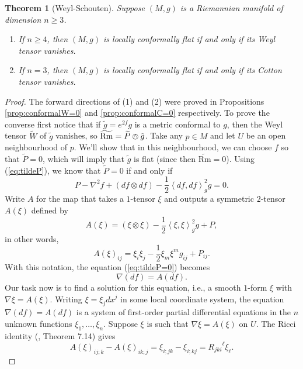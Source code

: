 \documentclass{amsart}
\numberwithin{equation}{section}
\newcommand{\law}{\left\langle}
\newcommand{\raw}{\right\rangle}
\newcommand{\Rm}{\mathrm{Rm}}
\theoremstyle{plain}
\newtheorem{thm}{Theorem}[section]
\theoremstyle{definition}
\theoremstyle{remark}
\begin{document}
\begin{thm}[Weyl-Schouten]
    Suppose $(M,g)$ is a Riemannian manifold of dimension $n \ge 3$.
    \begin{enumerate}
        \item If $n \ge 4$, then $(M, g)$ is locally conformally flat if and only if its Weyl tensor vanishes.
        \item If $n = 3$, then $(M,g)$ is locally conformally flat if and only if its Cotton tensor vanishes.
    \end{enumerate}
\end{thm}
\begin{proof}
    The forward directions of (1) and (2) were proved in Propositions \ref{prop:conformalW=0} and \ref{prop:conformalC=0} respectively. To prove the converse first notice that if $\tilde{g} = e^{2f}g$ is a metric conformal to $g$, then the Weyl tensor $\widetilde{W}$ of $\tilde{g}$ vanishes, so $\widetilde{\Rm} = \widetilde{P} \owedge \tilde{g}$. Take any $p \in M$ and let $U$ be an open neighbourhood of $p$. We'll show that in this neighbourhood, we can choose $f$ so that $\widetilde{P} = 0$, which will imply that $\tilde{g}$ is flat (since then $\widetilde{\Rm} = 0$). Using (\ref{eq:tildeP}), we know that $\widetilde{P} = 0$ if and only if
    \begin{equation}\label{eq:tildeP=0}
        P - \nabla^2 f + (df \otimes df) - \frac{1}{2}\law df, df \raw_g^2 g = 0.
    \end{equation}
    Write $A$ for the map that takes a $1$-tensor $\xi$ and outputs a symmetric $2$-tensor $A(\xi)$ defined by
    \[A(\xi) = (\xi \otimes \xi) - \frac{1}{2}\law \xi, \xi \raw_g^2 g + P, \]
    in other words,
    \begin{equation}\label{eq:A(xi)ij}
        A(\xi)_{ij} = \xi_i \xi_j - \frac{1}{2} \xi_m \xi^m g_{ij} + P_{ij}.
    \end{equation}
    With this notation, the equation (\ref{eq:tildeP=0}) becomes
    \[\nabla(df) = A(df).\]
    Our task now is to find a solution for this equation, i.e., a smooth $1$-form $\xi$ with $\nabla \xi = A(\xi)$. Writing $\xi = \xi_j dx^j$ in some local coordinate system, the equation $\nabla(df) = A(df)$ is a system of first-order partial differential equations in the $n$ unknown functions $\xi_1, \ldots, \xi_n$. Suppose $\xi$ is such that $\nabla \xi = A(\xi)$ on $U$. The Ricci identity (\cite{LeeRiemannian}, Theorem 7.14) gives
    \begin{equation}
        A(\xi)_{ij;k} - A(\xi)_{ik;j} = \xi_{i;jk} - \xi_{i;kj} = {R_{jki}}^\ell \xi_{\ell}.

\end{equation}
\end{proof}
\end{document}
